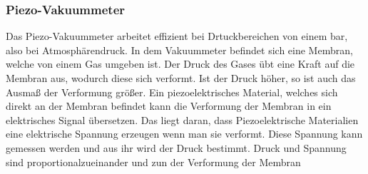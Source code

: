 \subsubsection{Piezo-Vakuummeter}
Das Piezo-Vakuummeter arbeitet effizient bei Drtuckbereichen von einem bar, also bei Atmosphärendruck.
In dem Vakuummeter befindet sich eine Membran, welche von einem Gas umgeben ist. Der Druck des Gases übt eine Kraft auf die Membran aus,
wodurch diese sich verformt. Ist der Druck höher, so ist auch das Ausmaß der Verformung größer. Ein piezoelektrisches Material, welches sich direkt
an der Membran befindet kann die Verformung der Membran in ein elektrisches Signal übersetzen. Das liegt daran, dass Piezoelektrische Materialien
eine elektrische Spannung erzeugen wenn man sie verformt. Diese Spannung kann gemessen werden und aus ihr wird der Druck bestimmt. Druck und Spannung 
sind proportionalzueinander und zun der Verformung der Membran 




















\cite{sample}
